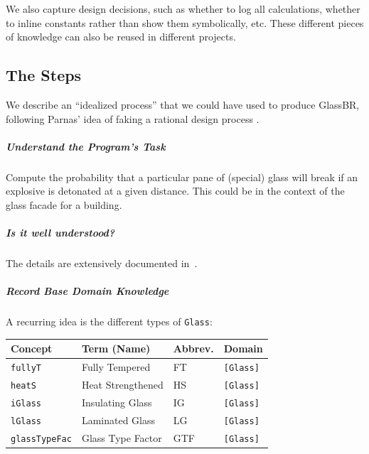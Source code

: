\documentclass[a4paper,UKenglish,cleveref,autoref,thm-restate]{oasics-v2021}
\begin{document}
We also capture design decisions, such as
whether to log all calculations, whether to inline constants rather than show
them symbolically, etc. These different pieces of knowledge can also be reused
in different projects.

\subsection{The Steps}
We describe an ``idealized process'' that we could have used to produce GlassBR,
following Parnas' idea of faking a rational design process \cite{Parnas1986}.

\subparagraph*{Understand the Program's Task} Compute the probability that a
particular pane of (special) glass will break if an explosive is detonated at a
given distance.  This could be in the context of the glass facade for a
building.

\subparagraph*{Is it well understood?} The details are extensively documented
in~\cite{ASTM2009, ASTM2015, BeasonEtAl1998}.

\subparagraph*{Record Base Domain Knowledge}
A recurring idea is the different types of \texttt{Glass}:
\begin{center}
  \begin{tabular}{|l|l|l|l|}
    \hline
    \textbf{Concept} & \textbf{Term (Name)} & \textbf{Abbrev.} & \textbf{Domain} \\ \hline
    \texttt{fullyT} & Fully Tempered & FT & \texttt{[Glass]} \\ \hline
    \texttt{heatS} & Heat Strengthened & HS & \texttt{[Glass]} \\ \hline
    \texttt{iGlass} & Insulating Glass & IG & \texttt{[Glass]} \\ \hline
    \texttt{lGlass} & Laminated Glass & LG & \texttt{[Glass]} \\ \hline
    \texttt{glassTypeFac} & Glass Type Factor & GTF & \texttt{[Glass]} \\ \hline
  \end{tabular}
\end{center}
\end{document}
